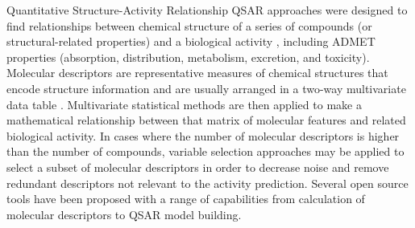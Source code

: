 Quantitative Structure-Activity Relationship QSAR approaches were designed to find relationships between chemical structure of a series of compounds (or structural-related properties) and a biological activity \cite{1995}, including ADMET properties (absorption, distribution, metabolism, excretion, and toxicity). Molecular descriptors are representative measures of chemical structures that encode structure information and are usually arranged in a two-way multivariate data table \cite{Consonni_2009}. Multivariate statistical methods are then applied to make a mathematical relationship between that matrix of molecular features and related biological activity. In cases where the number of molecular descriptors is higher than the number of compounds, variable selection approaches may be applied to select a subset of molecular descriptors in order to decrease noise and remove redundant descriptors not relevant to the activity prediction. Several open source tools have been proposed with a range of capabilities from calculation of molecular descriptors to QSAR model building. 